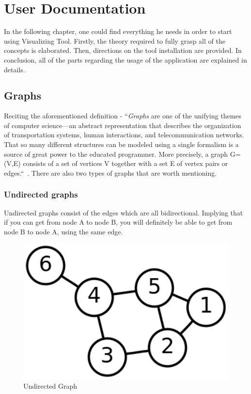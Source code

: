 \chapter{User Documentation} %
\label{ch:user}

In the following chapter, one could find everything he needs in order to start using Visualizing Tool. Firstly, the theory required to fully grasp all of the concepts is elaborated. Then, directions on the tool installation are provided. In conclusion, all of the parts regarding the usage of the application are explained in details.  

\section{Graphs}
Reciting the aforementioned definition - ``\emph{Graphs} are one of the unifying themes of computer science—an abstract representation that describes the organization of transportation systems, human interactions, and telecommunication networks. That so many different structures can be modeled using a single formalism is a source of great power to the educated programmer. More precisely, a graph G=(V,E) consists of a set of vertices V together with a set E of vertex pairs or edges.``~\cite{skiena-algorithm-design}. There are also two types of graphs that are worth mentioning.

\subsection{Undirected graphs}
Undirected graphs consist of the edges which are all bidirectional. Implying that if you can get from node A to node B, you will definitely be able to get from node B to node A, using the same edge. 

\begin{figure}[H]
	\centering
	\includegraphics[width=120mm]{images/Undirected_graph_image.png}
	\caption{Undirected Graph}
\end{figure}

